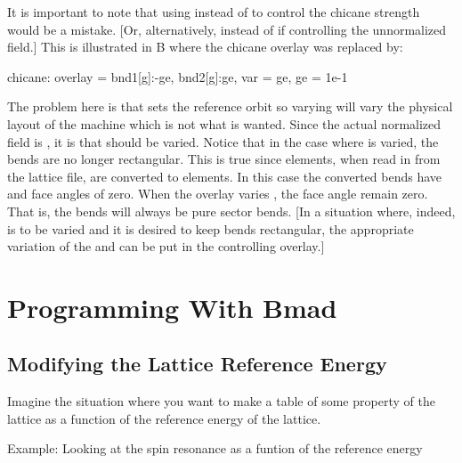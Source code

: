 \documentclass{hitec}     %
\newcommand{\Section}[1]{\section{#1}\vspace*{-1ex}}
\begin{document}
It is important to note that using  instead of  to control the chicane strength
would be a mistake. [Or, alternatively,  instead of  if controlling the
unnormalized field.] This is illustrated in B where the chicane overlay was replaced
by:
\begin{code}
  chicane: overlay = {bnd1[g]:-ge, bnd2[g]:ge}, var = {ge}, ge = 1e-1
\end{code}
The problem here is that  sets the reference orbit so varying  will vary the physical
layout of the machine which is not what is wanted. Since the actual normalized field is , it is  that should be varied. Notice that in the case where  is varied, the
bends are no longer rectangular. This is true since  elements, when read in from the
lattice file, are converted to  elements. In this case the converted bends have 
and  face angles of zero. When the  overlay varies , the face angle remain
zero. That is, the bends will always be pure sector bends. [In a situation where, indeed,  is
to be varied and it is desired to keep bends rectangular, the appropriate variation of the 
and  can be put in the controlling overlay.]

\Section{Programming With Bmad}
\label{s:bmad.program}

\subsection{Modifying the Lattice Reference Energy}

Imagine the situation where you want to make a table of some property of the lattice as a function
of the reference energy of the lattice. 

Example: Looking at the spin resonance as a funtion of the reference energy
\end{document}
